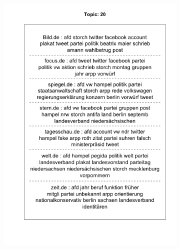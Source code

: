 \documentclass[12pt,a4paper,notitlepage]{article}
\begin{document}
\begin{figure}[H]
	\begin{center}
		\begin{subfigure}[normla]{0.49\textwidth}
			\includegraphics[width=\textwidth]{figs/plotquote20.png}
		\end{subfigure}
		\begin{subfigure}[normla]{0.49\textwidth}

\end{subfigure}
\end{center}
\end{figure}
\end{document}
